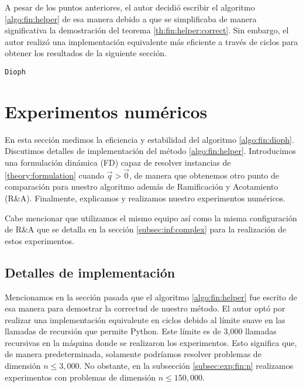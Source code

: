 A pesar de los puntos anteriores, el autor decidió escribir el algoritmo \ref{algo:fin:helper} de
esa manera debido a que se simplificaba de manera significativa la demostración del teorema
\ref{th:fin:helper:correct}. Sin embargo, el autor realizó una implementación equivalente más
eficiente a través de ciclos para obtener los resultados de la siguiente sección.

\begin{algorithm}[ht]
	\LinesNumbered
	\caption{\texttt{Dioph}}
	\label{algo:fin:dioph}
\end{algorithm}

\section{Experimentos numéricos}
\label{sec:fin:ex}
\noindent
En esta sección medimos la eficiencia y estabilidad del algoritmo \ref{algo:fin:dioph}. Discutimos
detalles de implementación del método \ref{algo:fin:helper}. Introducimos una formulación dinámica
(FD) capaz de resolver instancias de \eqref{theory:formulation} cuando $\vec{q} > \vec{0}$, de
manera que obtenemos otro punto de comparación para nuestro algoritmo además de Ramificación y
Acotamiento (R\&A). Finalmente, explicamos y realizamos nuestro experimentos numéricos.

Cabe mencionar que utilizamos el mismo equipo así como la misma configuración de R\&A que se detalla
en la sección \ref{subsec:inf:complex} para la realización de estos experimentos.

\subsection{Detalles de implementación}
\label{subsec:fin:details}
\noindent
Mencionamos en la sección pasada que el algoritmo \ref{algo:fin:helper} fue escrito de esa manera para demostrar la
correctud de nuestro método. El autor optó por realizar una implementación equivalente en ciclos
debido al límite suave en las llamadas de recursión que permite Python. Este límite es de 3{,}000
llamadas recursivas en la máquina donde se realizaron los experimentos. Esto significa que, de
manera predeterminada, solamente podríamos resolver problemas de dimensión $n \leq 3{,}000$. No
obstante, en la subsección \ref{subsec:exp:fin:n} realizamos experimentos con problemas de dimensión
$n \leq 150{,}000$.

